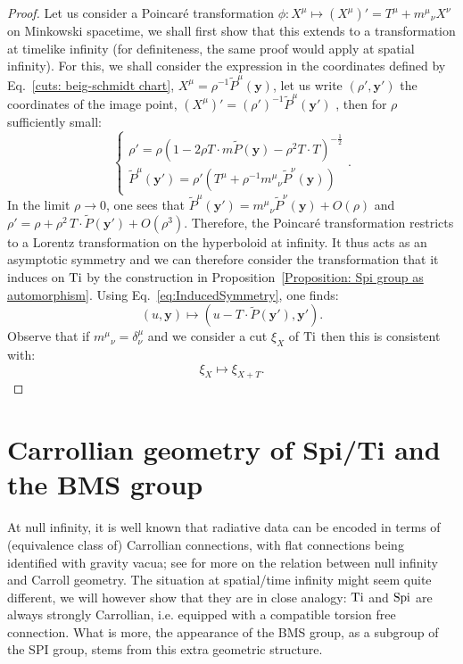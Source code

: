 \documentclass[a4paper, 10pt]{article}
\theoremstyle{remark}
\newcommand{\Ti}{\textnormal{Ti}}
\newcommand{\Spi}{\textnormal{Spi}}
\newcommand{\y}{\bm{y}}
\begin{document}
\begin{proof}
Let us consider a Poincaré transformation $\phi : X^\mu \mapsto (X^\mu)' =T^\mu +m^\mu{}_\nu X^\nu$ on Minkowski spacetime, we shall first show that this extends to a transformation at timelike infinity (for definiteness, the same proof would apply at spatial infinity). For this, we shall consider the expression in the coordinates defined by Eq.~\eqref{cuts: beig-schmidt chart}, $X^\mu = \rho^{-1}\tilde{P}^{\mu}(\y)$, let us write $(\rho', \bm{y}')$ the coordinates of the image point, $(X^\mu)' = (\rho')^{-1}\tilde{P}^{\mu}(\y')$ , then for $\rho$ sufficiently small:
\[\begin{cases} \rho'=  \rho \left(1-2\rho T\cdot m\tilde{P}(\bm{y})- \rho^2T\cdot T\right)^{-\frac{1}{2}} 
\\[0.75em] \tilde{P}^{\mu}(\bm{y}')=\rho'\left(T^{\mu}+\rho^{-1} m^{\mu}{}_{\nu} \tilde{P}^{\nu}(\bm{y}) \right)
\end{cases}. \]
In the limit $\rho \to 0$, one sees that $\tilde{P}^{\mu}(\bm{y}') = m^\mu{}_\nu\tilde{P}^\nu(\bm{y}) + O(\rho)$ and $\rho' =  \rho + \rho^2  \,T \cdot \tilde{P}(\bm{y}') + O(\rho^3)$. Therefore, the Poincaré transformation restricts to a Lorentz transformation on the hyperboloid at infinity. It thus acts as an asymptotic symmetry and we can therefore consider the transformation that it induces on $\Ti$ by the construction in Proposition~\ref{Proposition: Spi group as automorphism}. Using Eq.~\eqref{eq:InducedSymmetry}, one finds:
\[(u,\bm{y}) \mapsto (u - T \cdot \tilde{P}(\bm{y}'), \bm{y}').\]
Observe that if $m^\mu{}_\nu = \delta^\mu_\nu$ and we consider a cut $\xi_X$ of $\Ti$ then this is consistent with:
\[\xi_X \mapsto  \xi_{X+T}.\]
\end{proof}


    
\section{Carrollian geometry of Spi/Ti and the BMS group}\label{Section: Carrollian geometry of Spi}

At null infinity, it is well known \cite{ashtekar_radiative_1981,ashtekar_geometry_2015} that radiative data can be encoded in terms of (equivalence class of) Carrollian connections, with flat connections being identified with gravity vacua; see \cite{Herfray:2021qmp} for more on the relation between null infinity and Carroll geometry. The situation at spatial/time infinity might seem quite different, we will however show that they are in close analogy: $\Ti$ and $\Spi$ are always strongly Carrollian, i.e. equipped with a compatible torsion free connection. What is more, the appearance of the BMS group, as a subgroup of the SPI group, stems from this extra geometric structure.
\end{document}
